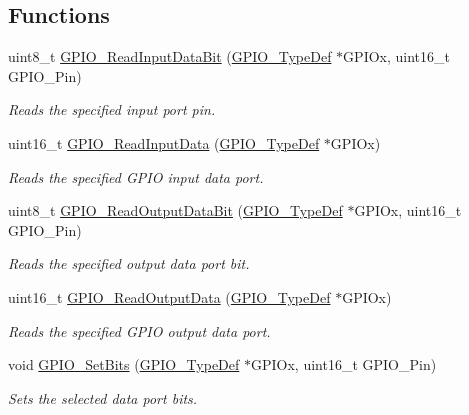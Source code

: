 \subsection*{Functions}
\begin{DoxyCompactItemize}
\item 
uint8\+\_\+t \hyperlink{group___g_p_i_o___group2_ga98772ef6b639b3fa06c8ae5ba28d3aaa}{G\+P\+I\+O\+\_\+\+Read\+Input\+Data\+Bit} (\hyperlink{struct_g_p_i_o___type_def}{G\+P\+I\+O\+\_\+\+Type\+Def} $\ast$G\+P\+I\+Ox, uint16\+\_\+t G\+P\+I\+O\+\_\+\+Pin)
\begin{DoxyCompactList}\small\item\em Reads the specified input port pin. \end{DoxyCompactList}\item 
uint16\+\_\+t \hyperlink{group___g_p_i_o___group2_ga139a33adc8409288e9f193bbebb5a0f7}{G\+P\+I\+O\+\_\+\+Read\+Input\+Data} (\hyperlink{struct_g_p_i_o___type_def}{G\+P\+I\+O\+\_\+\+Type\+Def} $\ast$G\+P\+I\+Ox)
\begin{DoxyCompactList}\small\item\em Reads the specified G\+P\+IO input data port. \end{DoxyCompactList}\item 
uint8\+\_\+t \hyperlink{group___g_p_i_o___group2_ga138270f8695b105b7c6ed405792919c1}{G\+P\+I\+O\+\_\+\+Read\+Output\+Data\+Bit} (\hyperlink{struct_g_p_i_o___type_def}{G\+P\+I\+O\+\_\+\+Type\+Def} $\ast$G\+P\+I\+Ox, uint16\+\_\+t G\+P\+I\+O\+\_\+\+Pin)
\begin{DoxyCompactList}\small\item\em Reads the specified output data port bit. \end{DoxyCompactList}\item 
uint16\+\_\+t \hyperlink{group___g_p_i_o___group2_gaf8938a34280b7dc3e39872a7c17bb323}{G\+P\+I\+O\+\_\+\+Read\+Output\+Data} (\hyperlink{struct_g_p_i_o___type_def}{G\+P\+I\+O\+\_\+\+Type\+Def} $\ast$G\+P\+I\+Ox)
\begin{DoxyCompactList}\small\item\em Reads the specified G\+P\+IO output data port. \end{DoxyCompactList}\item 
void \hyperlink{group___g_p_i_o___group2_ga9e1352eed7c6620e18af2d86f6b6ff8e}{G\+P\+I\+O\+\_\+\+Set\+Bits} (\hyperlink{struct_g_p_i_o___type_def}{G\+P\+I\+O\+\_\+\+Type\+Def} $\ast$G\+P\+I\+Ox, uint16\+\_\+t G\+P\+I\+O\+\_\+\+Pin)
\begin{DoxyCompactList}\small\item\em Sets the selected data port bits. \end{DoxyCompactList}\item 

\end{DoxyCompactItemize}
